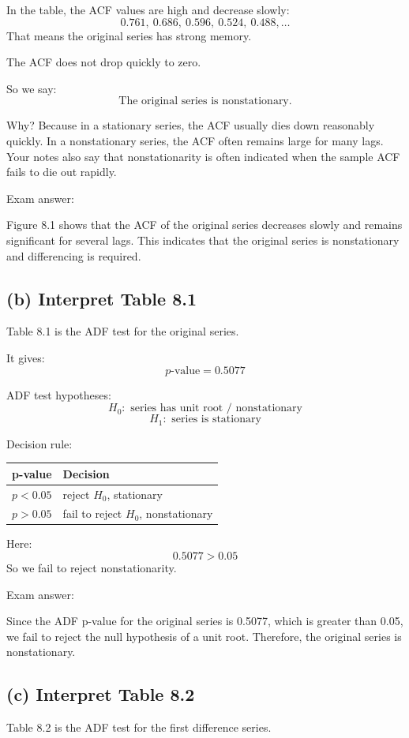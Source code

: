 \documentclass[11pt]{article}
\begin{document}
In the table, the ACF values are high and decrease slowly:
\[
0.761,\ 0.686,\ 0.596,\ 0.524,\ 0.488,\ldots
\]
That means the original series has strong memory.

The ACF does not drop quickly to zero.

So we say:
\[
\boxed{\text{The original series is nonstationary.}}
\]

Why? Because in a stationary series, the ACF usually dies down reasonably quickly. In a nonstationary series, the ACF often remains large for many lags. Your notes also say that nonstationarity is often indicated when the sample ACF fails to die out rapidly.

Exam answer:

Figure 8.1 shows that the ACF of the original series decreases slowly and remains significant for several lags. This indicates that the original series is nonstationary and differencing is required.

\subsection*{(b) Interpret Table 8.1}
Table 8.1 is the ADF test for the original series.

It gives:
\[
p\text{-value}=0.5077
\]

ADF test hypotheses:
\[
H_0: \text{ series has unit root / nonstationary}
\]
\[
H_1: \text{ series is stationary}
\]

Decision rule:

\begin{center}
\begin{tabular}{@{}rl@{}}
\toprule
p-value & Decision \\
\midrule
$p<0.05$ & reject $H_0$, stationary \\
$p>0.05$ & fail to reject $H_0$, nonstationary \\
\bottomrule
\end{tabular}
\end{center}

Here:
\[
0.5077>0.05
\]
So we fail to reject nonstationarity.

Exam answer:

Since the ADF p-value for the original series is 0.5077, which is greater than 0.05, we fail to reject the null hypothesis of a unit root. Therefore, the original series is nonstationary.

\subsection*{(c) Interpret Table 8.2}
Table 8.2 is the ADF test for the first difference series.
\end{document}
